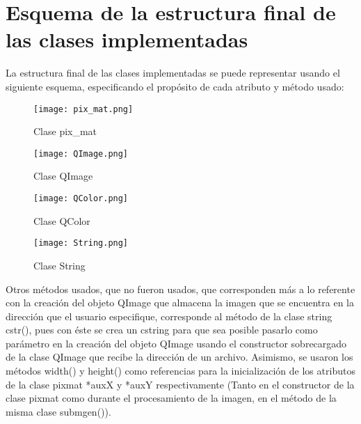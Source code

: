 \documentclass{article}
\begin{document}
\section{Esquema de la estructura final de las clases implementadas}
La estructura final de las clases implementadas se puede representar usando el siguiente esquema, especificando el propósito de cada atributo y método usado:
\begin{figure} 
    \centering
    \texttt{[image: pix\_mat.png]}
    \caption{Clase pix_mat}
    \label{fig:class_pix_mat}
\end{figure}
\begin{figure} 
    \centering
    \texttt{[image: QImage.png]}
    \caption{Clase QImage}
    \label{fig:class_qimage}
\end{figure}
\begin{figure} 
    \centering
    \texttt{[image: QColor.png]}
    \caption{Clase QColor}
    \label{fig:class_qcolor}
\end{figure}
\begin{figure} 
    \centering
    \texttt{[image: String.png]}
    \caption{Clase String}
    \label{fig:class_string}
\end{figure}
Otros métodos usados, que no fueron usados, que corresponden más a lo referente con la creación del objeto QImage que almacena la imagen que se encuentra en la dirección que el usuario especifique, corresponde al método de la clase string cstr(), pues con éste se crea un cstring para que sea posible pasarlo como parámetro en la creación del objeto QImage usando el constructor sobrecargado de la clase QImage que recibe la dirección de un archivo. Asimismo, se usaron los métodos width() y height() como referencias para la inicialización de los atributos de la clase pixmat *auxX y *auxY respectivamente (Tanto en el constructor de la clase pixmat como durante el procesamiento de la imagen, en el método de la misma clase submgen()).
\end{document}
